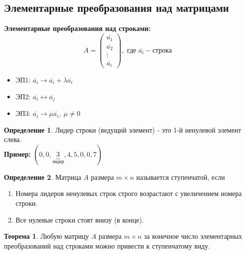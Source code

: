 \documentclass[a4paper, 12pt]{article}
\theoremstyle{definition}
\newtheorem*{definition}{Определение}
\newtheorem*{theorem}{Теорема}
\begin{document}
    \subsection{Элементарные преобразования над матрицами}
    \textbf{Элементарные преобразования над строками:} 
    $$A =\begin{pmatrix}
      \overline{a_1} \\
      \overline{a_2} \\
      \vdots \\
      \overline{a_i}
    \end{pmatrix}, \text{ где } \overline{a_i} - \text{строка}$$
    \begin{itemize}
      \item ЭП1: $\overline{a_i} \to \overline{a_i} + \lambda \overline{a_i}$
      \item ЭП2: $\overline{a_i} \longleftrightarrow   \overline{a_j}$
      \item ЭП3: $\overline{a_i} \to \mu \overline{a_i},\ \mu \neq 0$
  \end{itemize}
  \begin{definition}
    Лидер строки (ведущий элемент) - это 1-й ненулевой элемент слева. \\
    \textbf{Пример:} $(0, 0, \underbrace{3}_{\text{лидер}}, 4, 5, 0, 0, 7)$
  \end{definition}
  \begin{definition}
    Матрица $A$ размера $m\times n$ называется ступенчатой, если 
    \begin{enumerate}
      \item Номера лидеров ненулевых строк строго возрастают с увеличением номера строки.
      \item Все нулевые строки стоят внизу (в конце).
    \end{enumerate}
  \end{definition}
  \begin{theorem}
    Любую матрицу $A$ размера $m\times n$ за конечное число элементарных преобразований над строками можно привести к ступенчатому виду.
  \end{theorem}
\end{document}
